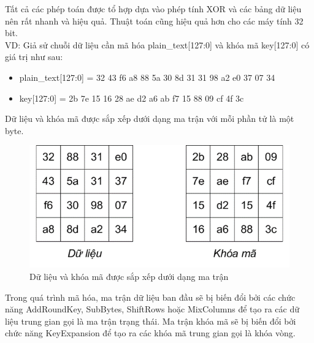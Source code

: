 Tất cả các phép toán được tổ hợp dựa vào phép tính XOR và các bảng dữ liệu nên rất nhanh và hiệu quả. Thuật toán cũng hiệu quả hơn cho các máy tính 32 bit.\\
VD: Giả sử chuỗi dữ liệu cần mã hóa plain\_text[127:0] và khóa mã key[127:0] có giá trị như sau:
\begin{itemize}
    \item plain\_text[127:0] = 32 43 f6 a8 88 5a 30 8d 31 31 98 a2 e0 37 07 34
    \item key[127:0] = 2b 7e 15 16 28 ae d2 a6 ab f7 15 88 09 cf 4f 3c
\end{itemize}
Dữ liệu và khóa mã được sắp xếp dưới dạng ma trận với mỗi phần tử là một byte.
\begin{figure}[H]
    \centering
    \includegraphics{Ảnh/hiền/vd aes.png}
    \caption{Dữ liệu và khóa mã được sắp xếp dưới dạng ma trận}
\end{figure}
Trong quá trình mã hóa, ma trận dữ liệu ban đầu sẽ bị biến đổi bởi các chức năng AddRoundKey, SubBytes, ShiftRows hoặc MixColumns để tạo ra các dữ liệu trung gian gọi là ma trận trạng thái. Ma trận khóa mã sẽ bị biến đổi bởi chức năng KeyExpansion để tạo ra các khóa mã trung gian gọi là khóa vòng.
